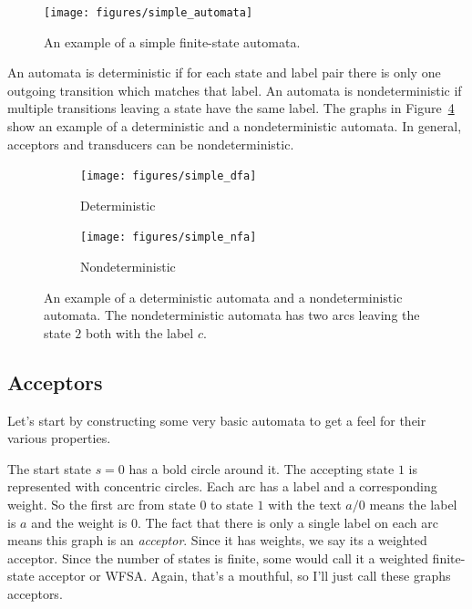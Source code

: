 \begin{figure}
    \centering
    \texttt{[image: figures/simple\_automata]}
    \caption{An example of a simple finite-state automata.}
    \label{fig:simple_automata}
 \end{figure}

An automata is deterministic if for each state and label pair there is only one
outgoing transition which matches that label. An automata is nondeterministic
if multiple transitions leaving a state have the same label. The graphs in
Figure~\ref{fig:dfa_nfa} show an example of a deterministic and a
nondeterministic automata. In general, acceptors and transducers can be
nondeterministic.

\begin{figure}
    \centering
    \begin{subfigure}[b]{0.48\textwidth}
        \texttt{[image: figures/simple\_dfa]}
        \caption{Deterministic}
        \label{fig:simple_dfa}
    \end{subfigure}
    \begin{subfigure}[b]{0.48\textwidth}
        \texttt{[image: figures/simple\_nfa]}
        \caption{Nondeterministic}
        \label{fig:simple_nfa}
    \end{subfigure}
    \caption{An example of a deterministic automata and a
    nondeterministic automata. The nondeterministic automata has
    two arcs leaving the state $2$ both with the label $c$.}
    \label{fig:dfa_nfa}
\end{figure}

\subsection{Acceptors}

Let's start by constructing some very basic automata to get a feel for their
various properties.

The start state $s = 0$ has a bold circle around it. The accepting state $1$ is
represented with concentric circles. Each arc has a label and a corresponding
weight. So the first arc from state $0$ to state $1$ with the text $a/0$ means
the label is $a$ and the weight is $0$. The fact that there is only a single
label on each arc means this graph is an \emph{acceptor}. Since it has weights,
we say its a weighted acceptor. Since the number of states is finite, some
would call it a weighted finite-state acceptor or WFSA. Again, that's a
mouthful, so I'll just call these graphs acceptors.


